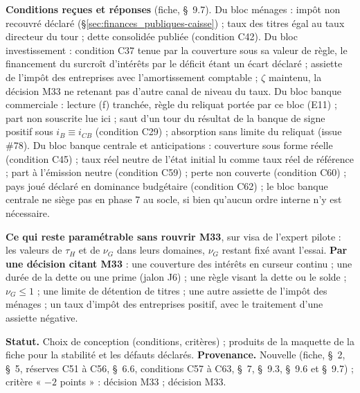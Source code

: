 \documentclass[11pt,a4paper]{article}
\begin{document}
\begin{proposee}
\textbf{Conditions reçues et réponses} (fiche, \S~9.7). Du bloc ménages : impôt non recouvré déclaré (\S\ref{sec:finances_publiques-caisse}) ; taux des titres égal au taux directeur du tour ; dette consolidée publiée (condition C42). Du bloc investissement : condition C37 tenue par la couverture sous sa valeur de règle, le financement du surcroît d'intérêts par le déficit étant un écart déclaré ; assiette de l'impôt des entreprises avec l'amortissement comptable ; $\zeta$ maintenu, la décision M33 ne retenant pas d'autre canal de niveau du taux. Du bloc banque commerciale : lecture (f) tranchée, règle du reliquat portée par ce bloc (E11) ; part non souscrite lue ici ; saut d'un tour du résultat de la banque de signe positif sous $i_B \equiv i_{\mathit{CB}}$ (condition C29) ; absorption sans limite du reliquat (issue \#78). Du bloc banque centrale et anticipations : couverture sous forme réelle (condition C45) ; taux réel neutre de l'état initial lu comme taux réel de référence ; part à l'émission neutre (condition C59) ; perte non couverte (condition C60) ; pays joué déclaré en dominance budgétaire (condition C62) ; le bloc banque centrale ne siège pas en phase 7 au socle, si bien qu'aucun ordre interne n'y est nécessaire.

\textbf{Ce qui reste paramétrable sans rouvrir M33}, sur visa de l'expert pilote : les valeurs de $\tau_H$ et de $\nu_G$ dans leurs domaines, $\nu_G$ restant fixé avant l'essai. \textbf{Par une décision citant M33} : une couverture des intérêts en curseur continu ; une durée de la dette ou une prime (jalon J6) ; une règle visant la dette ou le solde ; $\nu_G \le 1$ ; une limite de détention de titres ; une autre assiette de l'impôt des ménages ; un taux d'impôt des entreprises positif, avec le traitement d'une assiette négative.

\textbf{Statut.} Choix de conception (conditions, critères) ; produits de la maquette de la fiche pour la stabilité et les défauts déclarés. \textbf{Provenance.} Nouvelle (fiche, \S~2, \S~5, réserves C51 à C56, \S~6.6, conditions C57 à C63, \S~7, \S~9.3, \S~9.6 et \S~9.7) ; critère « $-2$ points » : décision M33 ; décision M33.
\end{proposee}
\end{document}
